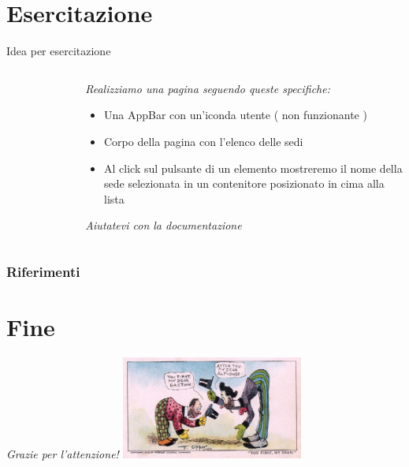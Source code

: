 \documentclass{../libs/presentation_format}
\begin{document}
\section{Esercitazione}
\begin{frame}{Idea per esercitazione}
	\begin{minipage}[0.2\textheight]{\textwidth}
		\begin{columns}[T]
			\begin{column}{0.4\textwidth}
				\begin{figure}[htpb]
					\centering
					\includegraphics[width=2cm]{../libs/Home - List-1}
				\end{figure}
			\end{column}
			\begin{column}{0.6\textwidth}
				\emph{Realizziamo una pagina seguendo queste specifiche:}
				\newline
				\begin{itemize}
					\item Una AppBar con un'iconda utente ( non funzionante )
					\item Corpo della pagina con l'elenco delle sedi
					\item Al click sul pulsante di un elemento mostreremo il nome della sede selezionata in un contenitore posizionato in cima alla lista
				\end{itemize}
				\emph{Aiutatevi con la documentazione}
			\end{column}
		\end{columns}
	\end{minipage}
\end{frame}


\begin{frame}[allowframebreaks]
    \frametitle{Riferimenti}
    \printbibliography
\end{frame}

\section{Fine}
\begin{frame}{}
	\huge\emph{Grazie per l'attenzione!}
	\newline
	\vfill
	\hfill\includegraphics[width=6cm]{../libs/alphonse-gaston-regards}
\end{frame}
\end{document}
